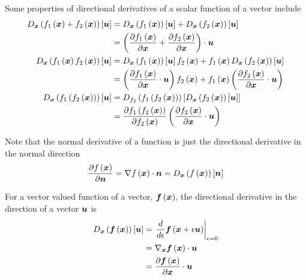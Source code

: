 Some properties of directional derivatives of a scalar function of a vector include
\begin{align}
  \directionalderiv{\vectr{x}}{\fnof{f_{1}}{\vectr{x}}+\fnof{f_{2}}{\vectr{x}}}{\vectr{u}}
  &=\directionalderiv{\vectr{x}}{\fnof{f_{1}}{\vectr{x}}}{\vectr{u}}
  +\directionalderiv{\vectr{x}}{\fnof{f_{2}}{\vectr{x}}}{\vectr{u}}
  \nonumber \\
  &=\dotprod{\pbrac{\delby{\fnof{f_{1}}{\vectr{x}}}{\vectr{x}}
      +\delby{\fnof{f_{2}}{\vectr{x}}}{\vectr{x}}}}{\vectr{u}}
  \label{eqn:AdditionRuleDirectDerivScalarValueVectorFunction} \\
  \directionalderiv{\vectr{x}}{\fnof{f_{1}}{\vectr{x}}\fnof{f_{2}}{\vectr{x}}}{\vectr{u}}
  &=\directionalderiv{\vectr{x}}{\fnof{f_{1}}{\vectr{x}}}{\vectr{u}}\fnof{f_{2}}{\vectr{x}}
  +\fnof{f_{1}}{\vectr{x}}\directionalderiv{\vectr{x}}{\fnof{f_{2}}{\vectr{x}}}{\vectr{u}}
  \nonumber \\
  &=\pbrac{\dotprod{\delby{\fnof{f_{1}}{\vectr{x}}}{\vectr{x}}}{\vectr{u}}}\fnof{f_{2}}{\vectr{x}}
  +\fnof{f_{1}}{\vectr{x}}\pbrac{\dotprod{\delby{\fnof{f_{2}}{\vectr{x}}}{\vectr{x}}}{\vectr{u}}}
  \label{eqn:ProductRuleDirectDerivScalarValueVectorFunction}\\
  \directionalderiv{\vectr{x}}{\fnof{f_{1}}{\fnof{f_{2}}{\vectr{x}}}}{\vectr{u}}
  &=\directionalderiv{f_{2}}{\fnof{f_{1}}{\fnof{f_{2}}{\vectr{x}}}}{\directionalderiv{\vectr{x}}{\fnof{f_{2}}{\vectr{x}}}{\vectr{u}}}
  \nonumber \\
  &=\delby{\fnof{f_{1}}{\fnof{f_{2}}{\vectr{x}}}}{\fnof{f_{2}}{\vectr{x}}}\pbrac{\dotprod{\delby{\fnof{f_{2}}{\vectr{x}}}{\vectr{x}}}{\vectr{u}}}
  \label{eqn:ChainRuleDirectDerivScalarValueVectorFunction}
\end{align}

Note that the normal derivative of a function is just the directional
derivative in the normal direction \ie
\begin{equation}
  \delby{\fnof{f}{\vectr{x}}}{\vectr{n}}=\dotprod{\gradient{}{\fnof{f}{\vectr{x}}}}{\vectr{n}}=\directionalderiv{\vectr{x}}{\fnof{f}{\vectr{x}}}{\vectr{n}}
\end{equation}

For a vector valued function of a vector, $ \boldsymbol{f}\left( \boldsymbol{x} \right) $, the
directional derivative in the direction of a vector $\boldsymbol{u}$ is
\begin{equation}
  \begin{split}
    \directionalderiv{\vectr{x}}{\fnof{\vectr{f}}{\vectr{x}}}{\vectr{u}}
    &=\evalat{\dfrac{d}{d\epsilon}\fnof{\vectr{f}}{\vectr{x}+\epsilon\vectr{u}}}{\epsilon=0}\\
    &=\dotprod{\gradient{\vectr{x}}{\fnof{\vectr{f}}{\vectr{x}}}}{\vectr{u}}\\
    &=\dotprod{\delby{\fnof{\vectr{f}}{\vectr{x}}}{\vectr{x}}}{\vectr{u}}\\
  \end{split}
\end{equation}

